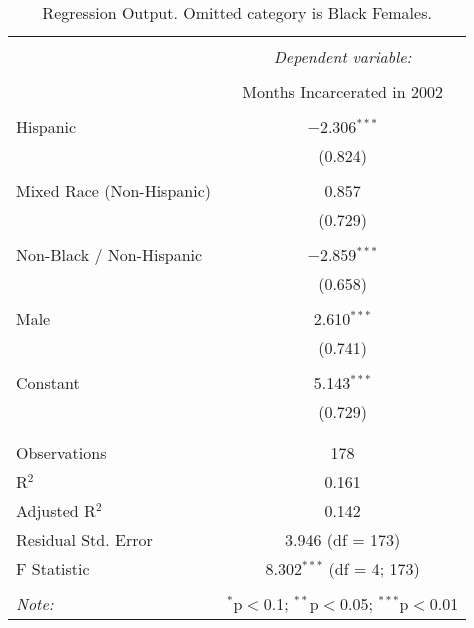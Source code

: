 
\begin{table}[!htbp] \centering 
  \caption{Regression Output. Omitted category is Black Females.} 
  \label{tab:regression} 
\begin{tabular}{@{\extracolsep{5pt}}lc} 
\\[-1.8ex]\hline 
\hline \\[-1.8ex] 
 & \multicolumn{1}{c}{\textit{Dependent variable:}} \\ 
\cline{2-2} 
\\[-1.8ex] & Months Incarcerated in 2002 \\ 
\hline \\[-1.8ex] 
 Hispanic & $-$2.306$^{***}$ \\ 
  & (0.824) \\ 
  & \\ 
 Mixed Race (Non-Hispanic) & 0.857 \\ 
  & (0.729) \\ 
  & \\ 
 Non-Black / Non-Hispanic & $-$2.859$^{***}$ \\ 
  & (0.658) \\ 
  & \\ 
 Male & 2.610$^{***}$ \\ 
  & (0.741) \\ 
  & \\ 
 Constant & 5.143$^{***}$ \\ 
  & (0.729) \\ 
  & \\ 
\hline \\[-1.8ex] 
Observations & 178 \\ 
R$^{2}$ & 0.161 \\ 
Adjusted R$^{2}$ & 0.142 \\ 
Residual Std. Error & 3.946 (df = 173) \\ 
F Statistic & 8.302$^{***}$ (df = 4; 173) \\ 
\hline 
\hline \\[-1.8ex] 
\textit{Note:}  & \multicolumn{1}{r}{$^{*}$p$<$0.1; $^{**}$p$<$0.05; $^{***}$p$<$0.01} \\ 
\end{tabular} 
\end{table} 
